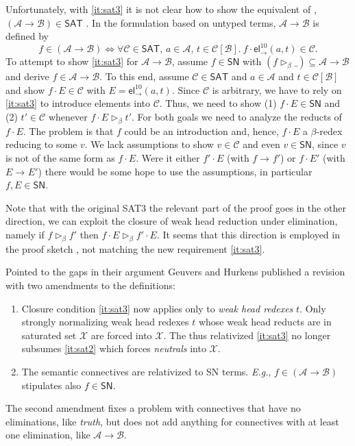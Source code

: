 \documentclass[a4paper,USenglish,cleveref, autoref, thm-restate]{lipics-v2019}
\newcommand{\Eg}{\emph{E.g.}\xspace}
\newcommand{\tel}{\mathsf{el}}
\newcommand{\el}[2]{\ensuremath{\tel_{#1}^{#2}}}
\newcommand{\whd}[1][]{\rhd_{#1}}
\newcommand{\red}[1][]{\longrightarrow_{#1}}
\newcommand{\A}{\mathcal{A}}
\newcommand{\B}{\mathcal{B}}
\newcommand{\C}{\mathcal{C}}
\newcommand{\X}{\mathcal{X}}
\newcommand{\SN}{\mathsf{SN}}
\newcommand{\SAT}{\mathsf{SAT}}
\begin{document}
Unfortunately, with \ref{it:sat3} it is not clear how to show the equivalent of
, $(\A \to \B) \in \SAT$ \cite[Lemma~58]{geuversHurkens:types17}.
In the formulation based on untyped terms, $\A \to \B$ is defined by
\[
  f \in (\A \to \B)
  \iff
  \forall \C \in \SAT, \,
  a \in \A, \,
  t \in \C[\B].\
  f \cdot \el\to{10}(a,t) \in \C .
\]
To attempt to show \ref{it:sat3} for $\A \to \B$, assume $f \in \SN$ with
$(f \whd[\beta]\_) \subseteq \A \to \B$ and derive $f \in \A \to \B$.
To this end, assume $\C \in \SAT$ and $a \in \A$ and $t \in \C[\B]$
and show $f \cdot E \in \C$ with $E = \el\to{10}(a,t)$.  Since $\C$ is
arbitrary, we have to rely on \ref{it:sat3} to introduce elements into
$\C$.  Thus, we need to show (1) $f \cdot E \in \SN$ and (2)
$t' \in \C$ whenever $f \cdot E \whd[\beta] t'$.  For both goals we need to
analyze the reducts of $f \cdot E$.  The problem is that $f$ could be
an introduction and, hence, $f \cdot E$ a $\beta$-redex reducing to
some $v$.  We lack assumptions to show $v \in \C$ and even $v \in
\SN$, since $v$ is not of the same form as $f \cdot E$.  Were it either
$f' \cdot E$ (with $f \red f'$) or $f \cdot E'$ (with $E \red E'$)
there would be some hope to use the assumptions, in particular $f,E \in \SN$.

Note that with the original SAT3 the relevant part of the proof goes
in the other direction, we can exploit the closure of weak head
reduction under elimination, namely if $f \whd[\beta] f'$
then $f \cdot E \whd[\beta] f' \cdot E$.  It seems that this direction
is employed in the proof sketch
\cite[Lemma~58.c]{geuversHurkens:types17}, not matching the new
requirement \ref{it:sat3}.

Pointed to the gaps in their argument Geuvers and Hurkens published a
revision \cite{geuversHurkens:addendumTypes17} with two amendments to
the definitions:
\begin{enumerate}
\item Closure condition \ref{it:sat3} now applies only to \emph{weak
    head redexes} $t$.  Only strongly normalizing weak head redexes
  $t$ whose weak head reducts are in saturated set $\X$ are forced
  into $\X$.  The thus relativized \ref{it:sat3} no longer subsumes
  \ref{it:sat2} which forces \emph{neutrals} into $\X$.
\item The semantic connectives are relativized to SN terms.  \Eg, $f
  \in (\A \to \B)$ stipulates also $f \in \SN$.
\end{enumerate}
The second amendment fixes a problem with connectives that have no
eliminations, like \emph{truth}, but does not add anything for
connectives with at least one elimination, like $\A \to \B$.
\end{document}
